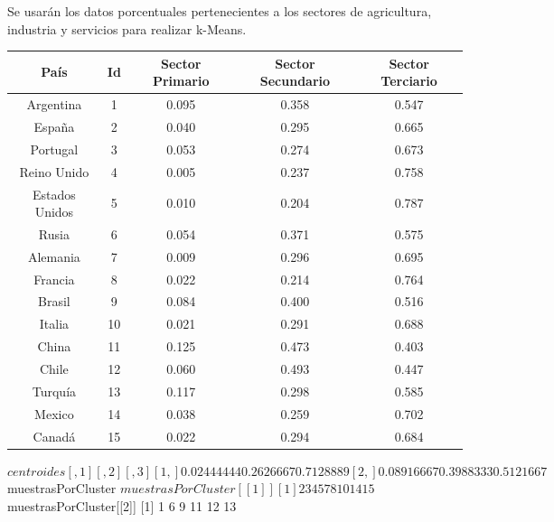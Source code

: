 \documentclass [a4paper] {article}
\begin{document}
\bigskip
Se usarán los datos porcentuales pertenecientes a los sectores de agricultura, industria y servicios para realizar
k-Means.

\begin{table}[H]
\begin{center}
\begin{tabular}{|c|c|c|c|c|}
\hline
País & Id & Sector Primario & Sector Secundario & Sector Terciario\\
\hline \hline
Argentina & 1 & 0.095 & 0.358 & 0.547\\ \hline
España & 2 & 0.040 & 0.295 & 0.665\\ \hline
Portugal & 3 & 0.053 & 0.274 & 0.673\\ \hline
Reino Unido & 4 & 0.005 & 0.237 & 0.758\\ \hline
Estados Unidos & 5 & 0.010 & 0.204 & 0.787\\ \hline
Rusia & 6 & 0.054 & 0.371 & 0.575\\ \hline
Alemania & 7 & 0.009 & 0.296 & 0.695\\ \hline
Francia & 8 & 0.022 & 0.214 & 0.764\\ \hline
Brasil & 9 & 0.084 & 0.400 & 0.516\\ \hline
Italia & 10 & 0.021 & 0.291 & 0.688\\ \hline
China & 11 & 0.125 & 0.473 & 0.403\\ \hline
Chile & 12 & 0.060 & 0.493 & 0.447\\ \hline
Turquía & 13 & 0.117 & 0.298 & 0.585\\ \hline
Mexico & 14 & 0.038 & 0.259 & 0.702\\ \hline
Canadá & 15 & 0.022 & 0.294 & 0.684\\ \hline
\end{tabular}
\end{center}
\end{table}

\bigskip
\begin{Schunk}
\begin{Soutput}
$centroides
           [,1]      [,2]      [,3]
[1,] 0.02444444 0.2626667 0.7128889
[2,] 0.08916667 0.3988333 0.5121667

$muestrasPorCluster
$muestrasPorCluster[[1]]
[1]  2  3  4  5  7  8 10 14 15

$muestrasPorCluster[[2]]
[1]  1  6  9 11 12 13
\end{Soutput}
\end{Schunk}
\end{document}
